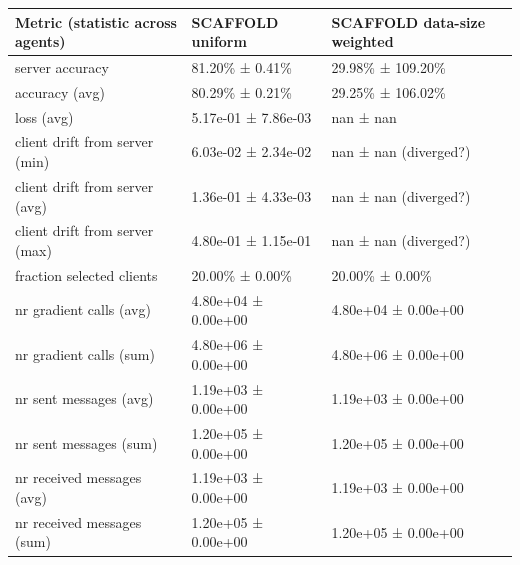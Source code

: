 \begin{tabular}{lll}
\hline
 Metric (statistic across agents)   & SCAFFOLD uniform    & SCAFFOLD data-size weighted   \\
\hline
 server accuracy                    & 81.20\% ± 0.41\%      & 29.98\% ± 109.20\%              \\
 accuracy (avg)                     & 80.29\% ± 0.21\%      & 29.25\% ± 106.02\%              \\
 loss (avg)                         & 5.17e-01 ± 7.86e-03 & nan ± nan                     \\
 client drift from server (min)     & 6.03e-02 ± 2.34e-02 & nan ± nan (diverged?)         \\
 client drift from server (avg)     & 1.36e-01 ± 4.33e-03 & nan ± nan (diverged?)         \\
 client drift from server (max)     & 4.80e-01 ± 1.15e-01 & nan ± nan (diverged?)         \\
 fraction selected clients          & 20.00\% ± 0.00\%      & 20.00\% ± 0.00\%                \\
 nr gradient calls (avg)            & 4.80e+04 ± 0.00e+00 & 4.80e+04 ± 0.00e+00           \\
 nr gradient calls (sum)            & 4.80e+06 ± 0.00e+00 & 4.80e+06 ± 0.00e+00           \\
 nr sent messages (avg)             & 1.19e+03 ± 0.00e+00 & 1.19e+03 ± 0.00e+00           \\
 nr sent messages (sum)             & 1.20e+05 ± 0.00e+00 & 1.20e+05 ± 0.00e+00           \\
 nr received messages (avg)         & 1.19e+03 ± 0.00e+00 & 1.19e+03 ± 0.00e+00           \\
 nr received messages (sum)         & 1.20e+05 ± 0.00e+00 & 1.20e+05 ± 0.00e+00           \\
\hline
\end{tabular}